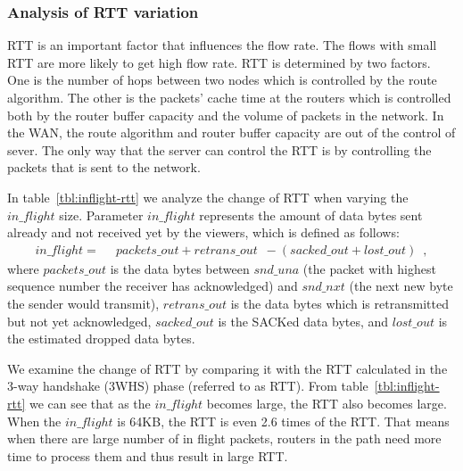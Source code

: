 \subsubsection{Analysis of RTT variation}
\label{sub:RTT}

RTT is an important factor that influences the flow rate. The flows with small RTT are more likely to get high flow rate. RTT is determined by two factors. One is the number of hops between two nodes which is controlled by the route algorithm. The other is the packets' cache time at the routers which is controlled both by the router buffer capacity and the volume of packets in the network. In the WAN, the route algorithm and router buffer capacity are out of the control of sever. The only way that the server can control the RTT is by controlling the packets that is sent to the network.

In table~\ref{tbl:inflight-rtt} we analyze the change of RTT when varying the $in\_flight$ size. Parameter $in\_flight$ represents the amount of data bytes sent already and not received yet by the viewers, which is defined as follows:
\begin{equation}
\label{eq:conserve}
\begin{aligned}
in\_flight = \enspace & packets\_out + retrans\_out \enspace - 
 (sacked\_out + lost\_out) \enspace ,
\end{aligned}
\end{equation}
where $packets\_out$ is the data bytes between $snd\_una$ (the packet with highest sequence number the receiver has acknowledged) and $snd\_nxt$ (the next new byte the sender would transmit), $retrans\_out$ is the data bytes which is retransmitted but not yet acknowledged, $sacked\_out$ is the SACKed data bytes, and $lost\_out$ is the estimated dropped data bytes.

We examine the change of RTT by comparing it with the RTT calculated in the 3-way handshake (3WHS) phase (referred to as RTT). From table~\ref{tbl:inflight-rtt} we can see that as the $in\_flight$ becomes large, the RTT also becomes large. When the $in\_flight$ is 64KB, the RTT is even 2.6 times of the RTT. That means when there are large number of in flight packets, routers in the path need more time to process them and thus result in large RTT.

